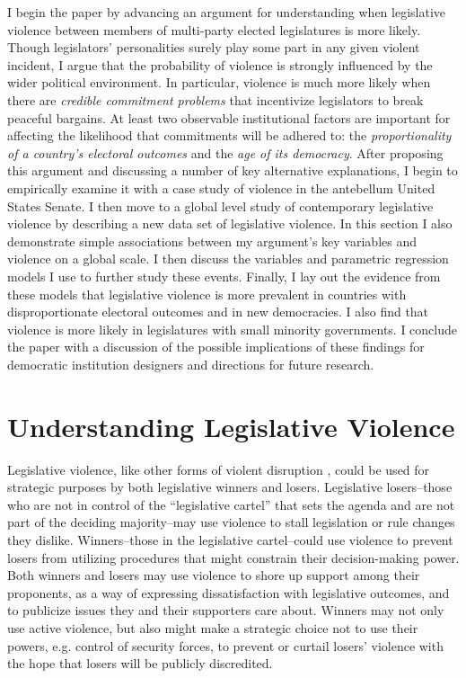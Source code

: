 \documentclass[a4paper]{article}\usepackage[]{graphicx}\usepackage[]{color}
\begin{document}
I begin the paper by advancing an argument for understanding when legislative violence between members of multi-party elected legislatures is more likely. Though legislators' personalities surely play some part in any given violent incident, I argue that the probability of violence is strongly influenced by the wider political environment. In particular, violence is much more likely when there are \emph{credible commitment problems} that incentivize legislators to break peaceful bargains. At least two observable institutional factors are important for affecting the likelihood that commitments will be adhered to: the \emph{proportionality of a country's electoral outcomes} and the \emph{age of its democracy}. After proposing this argument and discussing a number of key alternative explanations, I begin to empirically examine it with a case study of violence in the antebellum United States Senate. I then move to a global level study of contemporary legislative violence by describing a new data set of legislative violence. In this section I also demonstrate simple associations between my argument's key variables and violence on a global scale. I then discuss the variables and parametric regression models I use to further study these events. Finally, I lay out the evidence from these models that legislative violence is more prevalent in countries with disproportionate electoral outcomes and in new democracies. I also find that violence is more likely in legislatures with small minority governments. I conclude the paper with a discussion of the possible implications of these findings for democratic institution designers and directions for future research.


\section{Understanding Legislative Violence}

Legislative violence, like other forms of violent disruption \citep[see][]{Beaulieu2008,BeaulieuForthcoming,wilkinson2006}, could be used for strategic purposes by both legislative winners and losers. Legislative losers--those who are not in control of the ``legislative cartel''  that sets the agenda \citep{cox2007} and are not part of the deciding majority--may use violence to stall legislation or rule changes they dislike. Winners--those in the legislative cartel--could use violence to prevent losers from utilizing procedures that might constrain their decision-making power. Both winners and losers may use violence to shore up support among their proponents, as a way of expressing dissatisfaction with legislative outcomes, and to publicize issues they and their supporters care about. Winners may not only use active violence, but also might make a strategic choice not to use their powers, e.g. control of security forces, to prevent or curtail losers' violence with the hope that losers will be publicly discredited.
\end{document}
